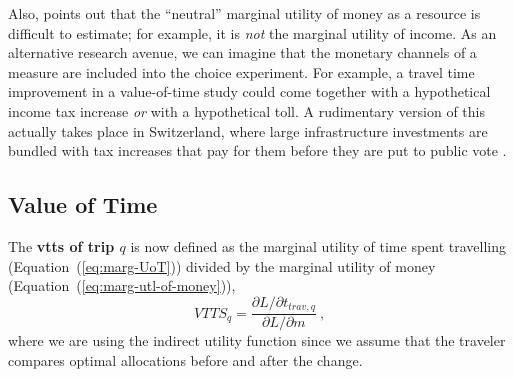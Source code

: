 Also, \cite{Small2012ValuationOfTimeRevisited} points out that the ``neutral'' marginal utility of money as a resource is difficult to estimate; for example, it is \emph{not} the marginal utility of income.
%
%
As an alternative research avenue, we can imagine that the monetary channels of a measure are included into the choice experiment.  For example, a travel time improvement in a value-of-time study could come together with a hypothetical income tax increase \emph{or} with a hypothetical toll.  A rudimentary version of this actually takes place in Switzerland, where large infrastructure investments are bundled with tax increases that pay for them before they are put to public vote \citep[see, e.g.,][]{BAV2013FinanzierungFABI}.







\subsection{Value of Time}

The \textbf{\gls{vtts} of trip $q$} is now defined as the marginal utility of time spent travelling (Equation~(\ref{eq:marg-UoT})) divided by the marginal utility of money (Equation~(\ref{eq:marg-utl-of-money})), \ie
%
\begin{equation}
VTTS_q = \frac{\partial L/\partial t_{trav,q}}{\partial L/\partial m} \ ,
\label{eq:vot}
\end{equation}
where we are using the indirect utility function 
since we assume that the traveler compares optimal allocations before and after the change.


